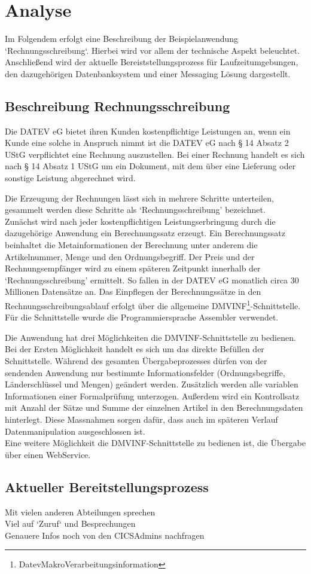 \chapter{Analyse}\label{ch:analyse}
Im Folgendem erfolgt eine Beschreibung der Beispielanwendung `Rechnungsschreibung`.
Hierbei wird vor allem der technische Aspekt beleuchtet.
Anschließend wird der aktuelle Bereiststellungsprozess für Laufzeitumgebungen, den dazugehörigen Datenbanksystem und einer Messaging Lösung dargestellt.

\section{Beschreibung Rechnungsschreibung}
Die DATEV eG bietet ihren Kunden kostenpflichtige Leistungen an, wenn ein Kunde eine solche in Anspruch nimmt ist die DATEV eG nach § 14 Absatz 2 UStG verpflichtet eine Rechnung auszustellen.
Bei einer Rechnung handelt es sich nach § 14 Absatz 1 UStG um ein Dokument, mit dem über eine Lieferung oder sonstige Leistung abgerechnet wird.

Die Erzeugung der Rechnungen lässt sich in mehrere Schritte unterteilen, gesammelt werden diese Schritte als `Rechnungsschreibung' bezeichnet.\\
Zunächst wird nach jeder kostenpflichtigen Leistungserbringung durch die dazugehörige Anwendung ein Berechnungssatz erzeugt.
Ein Berechnungssatz beinhaltet die Metainformationen der Berechnung unter anderem die Artikelnummer, Menge und den Ordnungsbegriff.
Der Preis und der Rechnungsempfänger wird zu einem späteren Zeitpunkt innerhalb der `Rechnungsschreibung' ermittelt.
So fallen in der DATEV eG monatlich circa 30 Millionen Datensätze an.
Das Einpflegen der Berechnungssätze in den Rechnungsschreibungsablauf erfolgt über die allgemeine DMVINF\footnote{DatevMakroVerarbeitungsinformation}-Schnittstelle.
Für die Schnittstelle wurde die Programmiersprache Assembler verwendet.

Die Anwendung hat drei Möglichkeiten die DMVINF-Schnittstelle zu bedienen. \\
Bei der Ersten Möglichkeit handelt es sich um das direkte Befüllen der Schnittstelle.
Während des gesamten Übergabeprozesses dürfen von der sendenden Anwendung nur bestimmte Informationsfelder (Ordnungsbegriffe, Länderschlüssel und Mengen) geändert werden.
Zusätzlich werden alle variablen Informationen einer Formalprüfung unterzogen.
Außerdem wird ein Kontrollsatz mit Anzahl der Sätze und Summe der einzelnen Artikel in den Berechnungsdaten hinterlegt.
Diese Massnahmen sorgen dafür, dass auch im späteren Verlauf Datenmanipulation ausgeschlossen ist. \\
Eine weitere Möglichkeit die DMVINF-Schnittstelle zu bedienen ist, die Übergabe über einen WebService.



\section{Aktueller Bereitstellungsprozess}
Mit vielen anderen Abteilungen sprechen\\
Viel auf `Zuruf` und Besprechungen\\
Genauere Infos noch von den CICSAdmins nachfragen\\

 